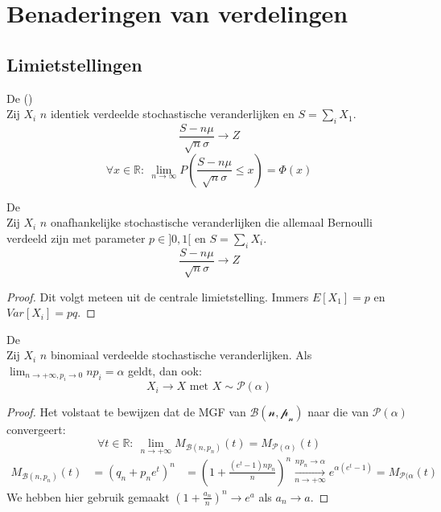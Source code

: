 \documentclass[main.tex]{subfiles}
\begin{document}
\chapter{Benaderingen van verdelingen}
\label{cha:benad-van-verd}

\section{Limietstellingen}
\label{sec:limietstellingen}

\begin{st}
  De  ()\\
  Zij $X_{i}$ $n$ identiek verdeelde stochastische veranderlijken en $S = \sum_{i}X_{1}$.
  \[ \frac{S-n\mu}{\sqrt{n}\sigma} \rightarrow Z \]
  \[ \forall x \in \mathbb{R}:\ \lim_{n \rightarrow \infty} P\left(\frac{S - n\mu}{\sqrt{n}\sigma} \le x\right) = \Phi(x) \]
  \zb
\end{st}

\begin{st}
  De \\
  Zij $X_{i}$ $n$ onafhankelijke stochastische veranderlijken die allemaal Bernoulli verdeeld zijn met parameter $p\in ]0,1[$ en $S = \sum_{i}X_{i}$.
  \[ \frac{S-n\mu}{\sqrt{n}\sigma} \rightarrow Z \]

  \begin{proof}
    Dit volgt meteen uit de centrale limietstelling.
    Immers $E[X_{1}] = p$ en $Var[X_{i}] = pq$.\needed
  \end{proof}
\end{st}

\begin{st}
  De \\
  Zij $X_{i}$ $n$ binomiaal verdeelde stochastische veranderlijken.
  Als $\lim_{n \rightarrow +\infty, p_{i} \rightarrow 0}np_{i} = \alpha$ geldt, dan ook:
  \[
  X_{i} \rightarrow X \text{ met } X \sim \mathcal{P}(\alpha)
  \]

  \begin{proof}
    Het volstaat te bewijzen dat de MGF van $\mathcal{B(n,p_{n})}$ naar die van $\mathcal{P}(\alpha)$ convergeert:
    \[ \forall t\in \mathbb{R}:\ \lim_{n\rightarrow +\infty}M_{\mathcal{B}(n,p_{n})}(t) = M_{\mathcal{P}(\alpha)}(t) \]
    \begin{align*}
       M_{\mathcal{B}(n,p_{n})}(t)
       &= (q_{n} + p_{n}e^{t})^{n}
       &= \left( 1 + \frac{(e^{t}-1)np_{n}}{n}\right)^{n}
       \overset{np_{n}\rightarrow \alpha}{\underset{n\rightarrow+\infty}{\longrightarrow}}
       e^{\alpha\left(e^{t}-1\right)}
       = M_{\mathcal{P}(\alpha}(t)
    \end{align*}
    We hebben hier gebruik gemaakt $\left(1 + \frac{a_{n}}{n}\right)^{n} \rightarrow e^{a}$ als $a_{n}\rightarrow a$.
  \end{proof}
\end{st}
\end{document}
